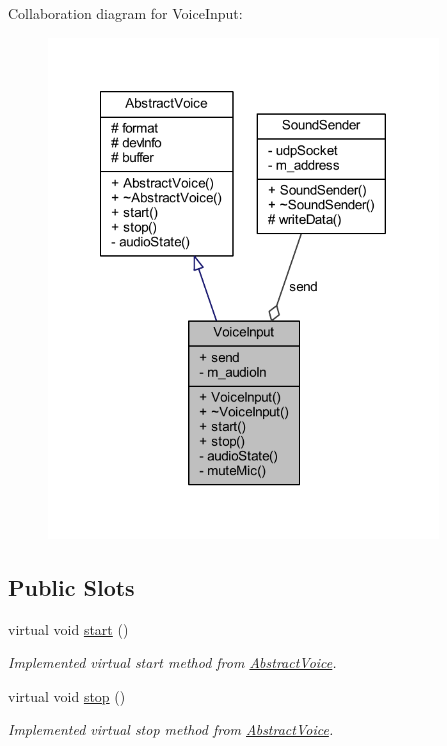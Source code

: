\-Collaboration diagram for \-Voice\-Input\-:\nopagebreak
\begin{figure}[H]
\begin{center}
\leavevmode
\includegraphics[width=293pt]{class_voice_input__coll__graph}
\end{center}
\end{figure}
\subsection*{\-Public \-Slots}
\begin{DoxyCompactItemize}
\item 
virtual void \hyperlink{class_voice_input_a99193e448e78f1bd10219bfb482d13ba}{start} ()
\begin{DoxyCompactList}\small\item\em \-Implemented virtual start method from \hyperlink{class_abstract_voice}{\-Abstract\-Voice}. \end{DoxyCompactList}\item 
virtual void \hyperlink{class_voice_input_aacdc744a4d9b156d79d05c7ea9361576}{stop} ()
\begin{DoxyCompactList}\small\item\em \-Implemented virtual stop method from \hyperlink{class_abstract_voice}{\-Abstract\-Voice}. \end{DoxyCompactList}\end{DoxyCompactItemize}
